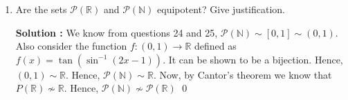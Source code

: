 \documentclass[10pt]{article}
\newcommand{\nn}{\mathbb{N}}
\newcommand{\rn}{\mathbb{R}}
\newcommand{\p}{\mathcal{P}}
\begin{document}
\begin{enumerate}

	    
    \item Are the sets $\p(\rn)$ and $\p(\nn)$ equipotent? Give justification. 

    \textbf{Solution : }We know from questions 24 and 25, $\p(\nn) \sim [0, 1] \sim (0, 1)$.
    Also consider the function $f : (0, 1) \to \rn$ defined as $f(x) = \tan(\sin^{-1}(2x - 1))$. It can be shown to be a bijection. Hence, $(0, 1) \sim \rn$. Hence, $\p(\nn) \sim \rn$. Now, by Cantor's theorem we know that $P(\rn) \not \sim \rn$. Hence, $\p(\nn) \not\sim \p(\rn)$ \qed
\end{enumerate}
\end{document}

